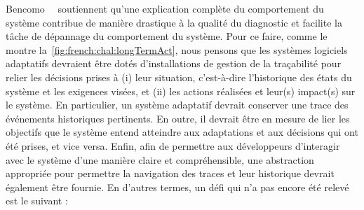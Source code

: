 Bencomo~\etal~\cite{DBLP:conf/iceccs/BencomoWSW12} soutiennent qu'une explication complète du comportement du système contribue de manière drastique à la qualité du diagnostic et facilite la tâche de dépannage du comportement du système. 
Pour ce faire, comme le montre la~\cref{fig:french:chal:longTermAct}, nous pensons que les systèmes logiciels adaptatifs devraient être dotés d'installations de gestion de la traçabilité pour relier les décisions prises à (i) leur  situation, c'est-à-dire l'historique des états du système et les exigences visées, et (ii) les actions réalisées et leur(s) impact(s) sur le système. 
En particulier, un système adaptatif devrait conserver une trace des événements historiques pertinents. 
En outre, il devrait être en mesure de lier les objectifs que le système entend atteindre aux adaptations et aux décisions qui ont été prises, et vice versa. 
Enfin, afin de permettre aux développeurs d'interagir avec le système d'une manière claire et compréhensible, une abstraction appropriée pour permettre la navigation des traces et leur historique devrait également être fournie. 
En d'autres termes, un défi qui n'a pas encore été relevé est le suivant :
\vspace{-2em}

